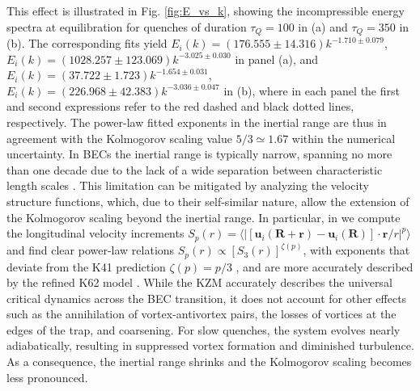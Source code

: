 \documentclass[aps,prl,twocolumn,showpacs,notitlepage,floatfix,superscriptaddress]{revtex4-1}
\begin{document}
This effect is illustrated in Fig. \ref{fig:E_vs_k}, showing the incompressible energy spectra at equilibration for quenches of duration $\tau_{Q}=100$ in (a) and $\tau_{Q}=350$ in (b).
The corresponding fits yield $E_i \left( k \right) = \left( 176.555 \pm 14.316 \right) k^{-1.710 \pm 0.079}$, $E_i \left( k \right) = \left( 1028.257 \pm 123.069 \right) k^{-3.025 \pm 0.030}$ in panel (a), and $E_i \left( k \right) = \left( 37.722 \pm 1.723 \right) k^{-1.654 \pm 0.031}$, $E_i \left( k \right) = \left( 226.968 \pm 42.383 \right) k^{-3.036 \pm 0.047}$ in (b),
where in each panel the first and second expressions refer to the red dashed and black dotted lines, respectively.
The power-law fitted exponents in the inertial range
are thus in agreement with the Kolmogorov scaling value $5/3\simeq 1.67$ within the numerical uncertainty.
In
BECs the inertial range is typically narrow, spanning no more than one decade due to the lack of a wide separation between characteristic length scales \cite{Kobayashi2005, Tsubota13, Barenghi2023textbook}.
This limitation can be mitigated by analyzing the velocity structure functions, which, due to their self-similar nature, allow the extension of the Kolmogorov scaling beyond the inertial range.
In particular, in \cite{SM} we compute the longitudinal velocity increments $S_p(r)=\langle |[\boldsymbol{u}_i(\boldsymbol{R}+\boldsymbol{r})-\boldsymbol{u}_i(\boldsymbol{R})]\cdot
\boldsymbol{r} / r
|^p \rangle$ and find clear power-law relations $S_p(r)\propto [S_3(r)]^{\zeta(p)}$, with exponents that deviate from the K41 prediction $\zeta(p)=p/3$
\cite{Kolmogorov41_first,Kolmogorov41,Benzi1993,Dubrulle1994,Ciliberto1994,Frisch1995,Krstulovic2016,Barenghi2023textbook,Zhao25}, and are more accurately described by the refined K62 model \cite{Kolmogorov_1962}.
While the KZM accurately describes the universal critical dynamics across the BEC transition, it does not account for other effects such as the annihilation of vortex-antivortex pairs, the losses of vortices at the edges of the trap, and coarsening.
For slow quenches, the system evolves nearly adiabatically, resulting in suppressed vortex formation and diminished turbulence. As a consequence, the inertial range shrinks and the Kolmogorov scaling becomes less pronounced.
\end{document}
